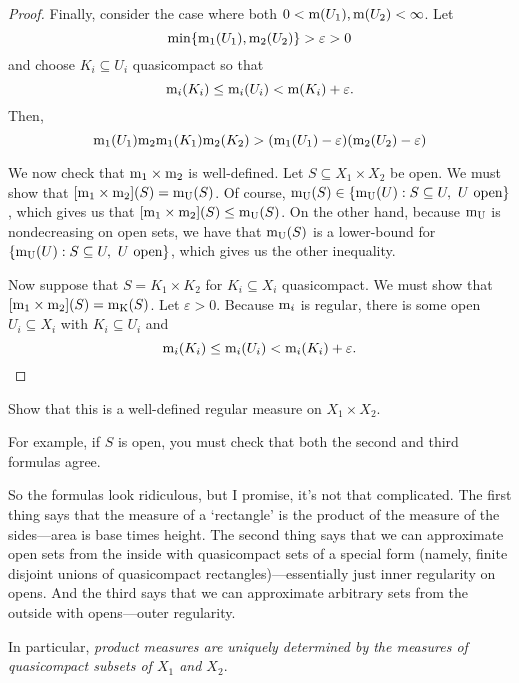 \begin{dfn}
\begin{prp}
\begin{savenotes}
\begin{proof}
Finally, consider the case where both $0<\mathrm{m} (U_1),\mathrm{m} (U_2)<\infty$.  Let
\begin{equation}
\min \{ \mathrm{m} _1(U_1),\mathrm{m} _2(U_2)\} >\varepsilon >0
\end{equation}
and choose $K_i\subseteq U_i$ quasicompact so that
\begin{equation}
\mathrm{m} _i(K_i)\leq \mathrm{m} _i(U_i)<\mathrm{m} (K_i)+\varepsilon .
\end{equation}
Then,
\begin{equation}
\mathrm{m} _1(U_1)\mathrm{m} _2\mathrm{m} _1(K_1)\mathrm{m} _2(K_2)>(\mathrm{m} _1(U_1)-\varepsilon )(\mathrm{m} _2(U_2)-\varepsilon )
\end{equation}

We now check that $\mathrm{m} _1\times \mathrm{m} _2$ is well-defined.  Let $S\subseteq X_1\times X_2$ be open.  We must show that $[\mathrm{m} _1\times \mathrm{m} _2](S)=\mathrm{m} _{\mathrm{U}}(S)$.  Of course, $\mathrm{m} _{\mathrm{U}}(S)\in \{ \mathrm{m} _{\mathrm{U}}(U):S\subseteq U,\ U\text{ open}\}$, which gives us that $[\mathrm{m} _1\times \mathrm{m} _2](S)\leq \mathrm{m} _{\mathrm{U}}(S)$.  On the other hand, because $\mathrm{m} _{\mathrm{U}}$ is nondecreasing on open sets, we have that $\mathrm{m} _{\mathrm{U}}(S)$ is a lower-bound for $\{ \mathrm{m} _{\mathrm{U}}(U):S\subseteq U,\ U\text{ open}\}$, which gives us the other inequality.

Now suppose that $S=K_1\times K_2$ for $K_i\subseteq X_i$ quasicompact.  We must show that $[\mathrm{m} _1\times \mathrm{m} _2](S)=\mathrm{m} _{\mathrm{K}}(S)$.  Let $\varepsilon >0$.  Because $\mathrm{m} _i$ is regular, there is some open $U_i\subseteq X_i$ with $K_i\subseteq U_i$ and
\begin{equation}
\mathrm{m} _i(K_i)\leq \mathrm{m} _i(U_i)<\mathrm{m} _i(K_i)+\varepsilon .
\end{equation}
\end{proof}
\end{savenotes}
\end{prp}
\begin{exr}\label{exr5.2.4}
Show that this is a well-defined regular measure on $X_1\times X_2$.
\begin{rmk}
For example, if $S$ is open, you must check that both the second and third formulas agree.
\end{rmk}
\end{exr}
\begin{rmk}
So the formulas look ridiculous, but I promise, it's not that complicated.  The first thing says that the measure of a `rectangle' is the product of the measure of the sides---area is base times height.  The second thing says that we can approximate open sets from the inside with quasicompact sets of a special form (namely, finite disjoint unions of quasicompact rectangles)---essentially just inner regularity on opens.  And the third says that we can approximate arbitrary sets from the outside with opens---outer regularity.
\end{rmk}
\begin{rmk}
In particular, \emph{product measures are uniquely determined by the measures of quasicompact subsets of $X_1$ and $X_2$}.
\end{rmk}
\end{dfn}
